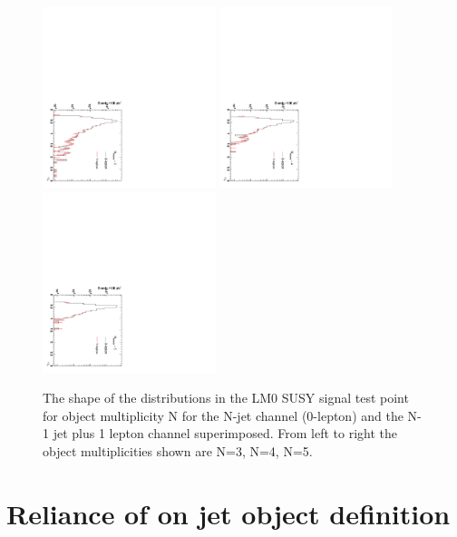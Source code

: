 \begin{figure}
\centering
\includegraphics[width=0.45\textwidth, angle=90]{Figures/AlphaT/aT_3_conv}
\includegraphics[width=0.45\textwidth,angle=90]{Figures/AlphaT/aT_4_conv}
\includegraphics[width=0.45\textwidth,angle=90]{Figures/AlphaT/aT_5_conv}
\caption{\label{fig:aTnobj}The shape of the \alt distributions in the LM0 SUSY signal test point for object multiplicity N for the N-jet channel (0-lepton) and the N-1 jet plus 1 lepton channel superimposed. From left to right the object multiplicities shown are N=3, N=4, N=5.}
\end{figure}

\section{Reliance of \alt on jet object definition}

